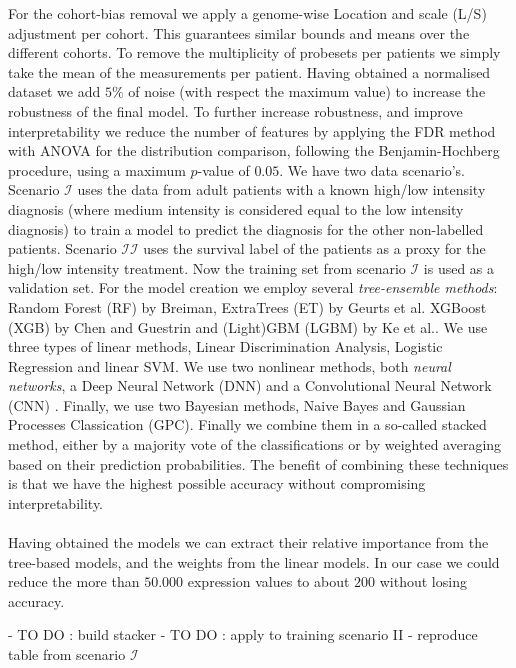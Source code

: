For the cohort-bias removal we apply a genome-wise Location and scale (L/S) adjustment per cohort. This guarantees
similar bounds and means over the different cohorts. To remove the multiplicity of probesets per patients
we simply take the mean of the measurements per patient. Having obtained a normalised dataset we add $5\%$
of noise (with respect the maximum value) to increase the robustness of the final model. To further increase robustness, and improve 
interpretability we reduce the number of features by applying the FDR method with ANOVA for the distribution comparison, 
following the Benjamin-Hochberg procedure, using a maximum $p$-value of $0.05$. 
%
We have two data scenario's. Scenario $\mathcal{I}$ uses the data from adult patients with a known high/low intensity diagnosis (where 
medium intensity is considered equal to the low intensity diagnosis) to train a model to predict the diagnosis for the other non-labelled patients.
Scenario $\mathcal{II}$ uses the survival label of the patients as a proxy for the high/low intensity treatment. Now the training set from scenario
$\mathcal{I}$ is used as a validation set.
%
For the model creation we employ several \textit{tree-ensemble methods}: Random Forest (RF) by Breiman\cite{Breiman2001}, ExtraTrees (ET) by Geurts et al.\cite{Geurts2006} 
XGBoost (XGB) by Chen and Guestrin\cite{Chen2016} and (Light)GBM (LGBM) by Ke et al.\cite{Ke2017}. 
We use three types of linear methods, Linear Discrimination Analysis, Logistic Regression and linear SVM.
We use two nonlinear methods, both \textit{neural networks}, a Deep Neural Network (DNN) \cite{lecun2015deep} and a Convolutional Neural Network (CNN) \cite{Lecun98}.
Finally, we use two Bayesian methods, Naive Bayes and Gaussian Processes Classication (GPC).
%
Finally we combine them in a so-called stacked method, either by a majority vote of the classifications or by weighted averaging based on their prediction probabilities.
The benefit of combining these techniques is that we have the highest possible accuracy without compromising interpretability. \\ \\
%
Having obtained the models we can extract their relative importance from the tree-based models, and the weights from the linear models.
In our case we could reduce the more than $50.000$ expression values to about $200$ without losing accuracy. 

- TO DO : build stacker
- TO DO : apply to training scenario II
- reproduce table from scenario $\mathcal{I}$